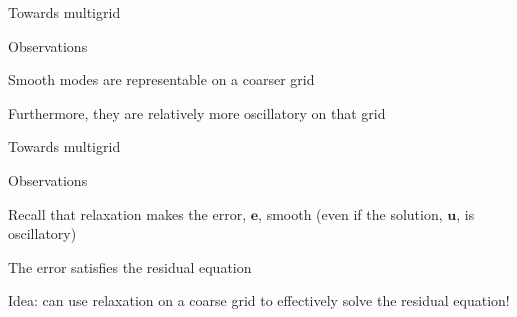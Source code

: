 \documentclass[18pt,xcolor=table]{beamer}
\begin{document}
\begin{frame}{Towards multigrid}
\begin{block}{Observations}
\bit
\item Smooth modes are representable on a coarser grid
\item Furthermore, they are relatively more oscillatory on that grid 
\eit
\end{block}
\end{frame}

\begin{frame}{Towards multigrid}
\begin{block}{Observations}
\bit
\item Recall that relaxation makes the error, $\mathbf{e}$, smooth (even if the solution, $\mathbf{u}$, is oscillatory)
\item The error satisfies the residual equation
\item Idea: can use relaxation on a coarse grid to effectively solve the residual equation! 
\eit
\end{block}
\end{frame}
\end{document}
